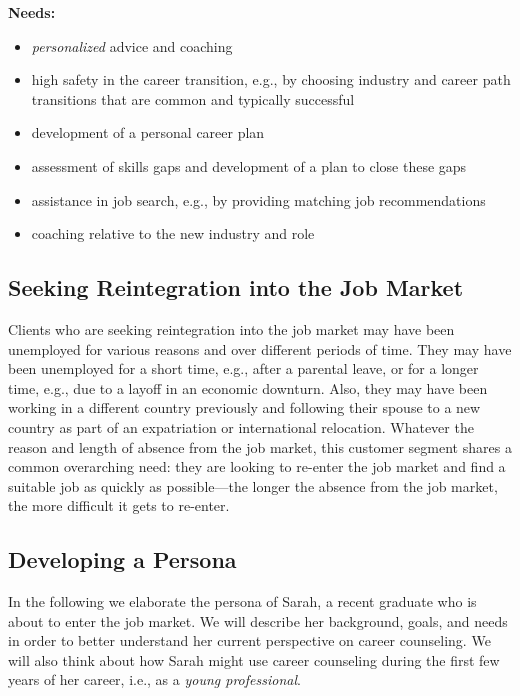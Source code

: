 \noindent\textbf{Needs:}
\begin{itemize}
    \item \textit{personalized} advice and coaching
    \item high safety in the career transition, e.g., by choosing industry and career path transitions that are common
        and typically successful
    \item development of a personal career plan
    \item assessment of skills gaps and development of a plan to close these gaps
    \item assistance in job search, e.g., by providing matching job recommendations
    \item coaching relative to the new industry and role
\end{itemize}
\vspace*{0.1cm} 

\subsection{Seeking Reintegration into the Job Market}

Clients who are seeking reintegration into the job market may have been unemployed for various reasons and over
different periods of time. They may have been unemployed for a short time, e.g., after a parental leave, or for
a longer time, e.g., due to a layoff in an economic downturn. Also, they may have been working in a different
country previously and following their spouse to a new country as part of an expatriation or international
relocation. Whatever the reason and length of absence from the job market, this customer segment shares a
common overarching need: they are looking to re-enter the job market and find a suitable job as quickly as
possible---the longer the absence from the job market, the more difficult it gets to re-enter.

\subsection{Developing a Persona}

In the following we elaborate the persona of Sarah, a recent graduate who is about to enter the job market. We will
describe her background, goals, and needs in order to better understand her current perspective on career counseling.
We will also think about how Sarah might use career counseling during the first few years of her career, i.e., as
a \textit{young professional}.
\newline

